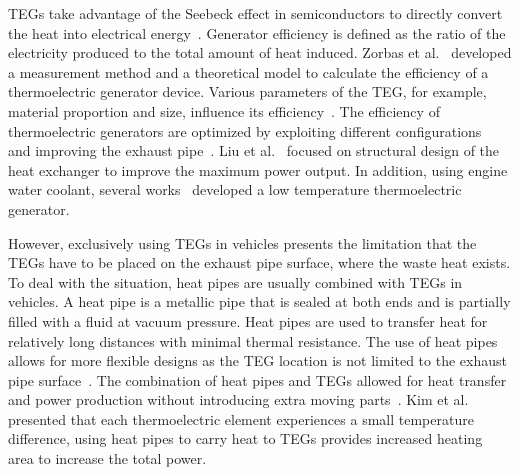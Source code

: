 TEGs take advantage of the Seebeck effect in semiconductors to directly convert the heat into electrical energy~\cite{JX_54,JX_60,JX_76}. Generator efficiency is defined as the ratio of the electricity produced to the total amount of heat induced. Zorbas et al.~\cite{JX_76} developed a measurement method and a theoretical model to calculate the efficiency of a thermoelectric generator device. Various parameters of the TEG, for example, material proportion and size, influence its efficiency~\cite{JX_18}. The efficiency of thermoelectric generators are optimized by exploiting different configurations~\cite{JX_27,JX_43} and improving the exhaust pipe~\cite{JX_71}. Liu et al.~\cite{JX_44} focused on structural design of the heat exchanger to improve the maximum power output. In addition, using engine water coolant, several works~\cite{JX_7,JX_35} developed a low temperature thermoelectric generator.

However, exclusively using TEGs in vehicles presents the limitation that the TEGs have to be placed on the exhaust pipe surface, where the waste heat exists. To deal with the situation, heat pipes are usually combined with TEGs in vehicles. A heat pipe is a metallic pipe that is sealed at both ends and is partially filled with a fluid at vacuum pressure. Heat pipes are used to transfer heat for relatively long distances with minimal thermal resistance. The use of heat pipes allows for more flexible designs as the TEG location is not limited to the exhaust pipe surface~\cite{JX_56}. The combination of heat pipes and TEGs allowed for heat transfer and power production without introducing extra moving parts~\cite{JX_36,JX_44,JX_56}. Kim et al.~\cite{JX_36} presented that each thermoelectric element experiences a small temperature difference, using heat pipes to carry heat to TEGs provides increased heating area to increase the total power.

%
